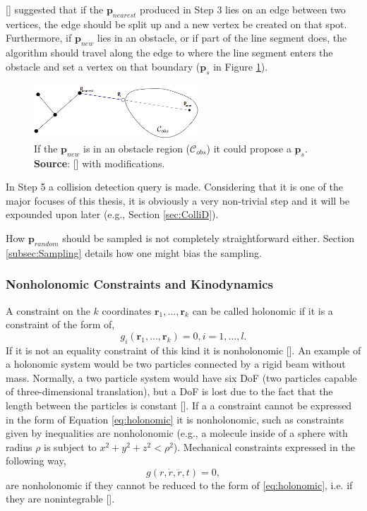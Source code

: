 [\citeauthor{LaValle2006}] suggested that if the $\textbf{p}_{nearest}$ produced in Step 3 lies on an edge between two vertices, the edge should be split up and a new vertex be created on that spot. Furthermore, if $\textbf{p}_{new}$ lies in an obstacle, or if part of the line segment does, the algorithm should travel along the edge to where the line segment enters the obstacle and set a vertex on that boundary ($\textbf{p}_s$ in Figure \ref{fig:RRT_edgetravel}).

\begin{figure}[h]
	\centering
	\includegraphics[width=0.55\textwidth]{import/RRT_edgetravel.png}
	\caption{If the $\textbf{p}_{new}$ is in an obstacle region ($\mathcal{C}_{obs}$) it could propose a $\textbf{p}_s$. \textbf{Source}: [\citeauthor{LaValle2006}] with modifications.}
	\label{fig:RRT_edgetravel}
\end{figure}

In Step 5 a collision detection query is made. Considering that it is one of the major focuses of this thesis, it is obviously a very non-trivial step and it will be expounded upon later (e.g., Section \ref{sec:ColliD}).

How $\textbf{p}_{random}$ should be sampled is not completely straightforward either. Section \ref{subsec:Sampling} details how one might bias the sampling.

\subsubsection{Nonholonomic Constraints and Kinodynamics}
A constraint on the $k$ coordinates $\textbf{r}_1, ..., \textbf{r}_k$ can be called holonomic if it is a constraint of the form of,
\begin{equation}
	g_i(\textbf{r}_1, ..., \textbf{r}_k) = 0, i = 1, ..., l.
	\label{eq:holonomic}
\end{equation}
If it is not an equality constraint of this kind it is nonholonomic [\citeauthor{Spong2004}]. An example of a holonomic system would be two particles connected by a rigid beam without mass. Normally, a two particle system would have six \gls{DoF} (two particles capable of three-dimensional translation), but a \gls{DoF} is lost due to the fact that the length between the particles is constant [\citeauthor{Chung2004}]. If a a constraint cannot be expressed in the form of Equation \ref{eq:holonomic} it is nonholonomic, such as constraints given by inequalities are nonholonomic (e.g., a molecule inside of a sphere with radius $\rho$ is subject to $x^2 + y^2 + z^2 < \rho^2$). Mechanical constraints expressed in the following way,
\begin{equation}
	g(r, \dot{r}, \ddot{r}, t) = 0,
	\label{eq:nonholo}
\end{equation}
are nonholonomic if they cannot be reduced to the form of \ref{eq:holonomic}, i.e. if they are nonintegrable [\citeauthor{Chung2004}].

